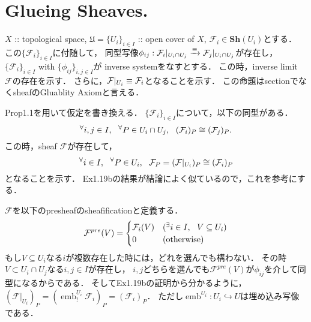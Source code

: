 \documentclass[a4paper]{jsarticle}
\newcommand{\shF}{\mathcal{F}}
\newcommand{\Sh}{\mathbf{Sh}}
\newcommand{\emb}{\operatorname{emb}}
\begin{document}
    \subsection{ }

\section{Glueing Sheaves.} %
    $X$ :: topological space, 
    $\mathfrak{U}=\{U_i\}_{i \in I}$ :: open cover of $X$,
    $\shF_i \in \Sh(U_i)$とする．
    この$\{\shF_i\}_{i \in I}$に付随して，
    同型写像$\phi_{ij}: \shF_i|_{U_i \cap U_j} \isomap \shF_j|_{U_i \cap U_j}$が存在し，
    $\{\shF_i\}_{i \in I}$ with $\{\phi_{ij}\}_{i,j \in I}$が
    inverse systemをなすとする．
    この時，inverse limit $\shF$の存在を示す．
    さらに，$\shF|_{U_i} \iso \shF_i$となることを示す．
    この命題はsectionでなくsheafのGluablity Axiomと言える．
 
    Prop1.1を用いて仮定を書き換える．
    $\{\shF_i\}_{i \in I}$について，以下の同型がある．
    \[ \Forall{i,j \in I} \Forall{P \in U_i \cap U_j} (\shF_i)_P \cong (\shF_j)_P. \]
    この時，sheaf $\shF$が存在して，
    \[ \Forall{i \in I} \Forall{P \in U_i} \shF_P=(\shF|_{U_i})_P \cong (\shF_i)_P \]
    となることを示す．
    Ex1.19bの結果が結論によく似ているので，これを参考にする．

    $\shF$を以下のpresheafのsheafificationと定義する．
    \[
        \shF^{pre}(V)=
        \begin{cases}{}
            \shF_i(V) & (\Exists{i \in I} V \subseteq U_i) \\
            0 & (\text{otherwise})
        \end{cases}
    \]
    もし$V \subseteq U_i$なる$i$が複数存在した時には，どれを選んでも構わない．
    その時$V \subset U_i \cap U_j$なる$i,j \in I$が存在し，
    $i,j$どちらを選んでも$\shF^{pre}(V)$が$\phi_{ij}$を介して同型になるからである．
    そしてEx1.19bの証明から分かるように，$(\shF|_{U_i})_P=(\emb^{U_i}_! \shF_i)_P=(\shF_i)_P$．
    ただし$\emb^{U_i}: U_i \hookrightarrow U$は埋め込み写像である．
\end{document}

